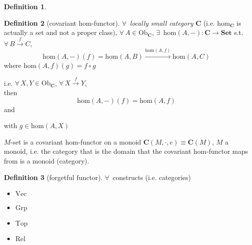 \documentclass[twoside,landscape,10pt]{amsart}
\theoremstyle{plain}
\theoremstyle{definition}
\newtheorem{definition}{Definition}
\theoremstyle{remark}
\begin{document}
\begin{multicols*}{2}
\begin{definition}


\end{definition}


\begin{definition}[covariant hom-functor]
$\forall \, $ \emph{locally small category} $\mathbf{C}$ (i.e. $\text{hom}_{\mathbf{C}}$ is actually a set and not a proper class), $\forall \, A \in \text{Ob}_{\mathbf{C}}$, $\exists \, $  $\text{hom}(A, - ) : \mathbf{C} \to \mathbf{\text{Set}}$ s.t. $\forall \, B \xrightarrow{f} C$, 
\[
\text{hom}(A,-)(f) = \text{hom}(A,B) \xrightarrow{ \text{hom}(A,f)} \text{hom}(A,C)
\]
where $\text{hom}(A,f)(g) = f\circ g$
\end{definition}

i.e. $\forall \, X,Y \in \text{Ob}_{\mathbf{C}}$, $\forall \, X \xrightarrow{f} Y$,  \\

then 
\[
\text{hom}(A,-)(f) = \text{hom}(A,f)
\]
and
with $g\in \text{hom}(A,X)$


$M$-set is a covariant hom-functor on a monoid $\mathbf{C}(M,\cdot,e) \equiv \mathbf{C}(M)$, $M$ a monoid, i.e. the category that is the domain that the covariant hom-functor maps from is a monoid (category).  

\begin{definition}[forgetful functor]
$\forall \, $ constructs (i.e. categories)
\begin{itemize}
  \item $\text{Vec}$
  \item $\text{Grp}$
  \item $\text{Top}$
  \item $\text{Rel}$
\end{itemize}


\end{definition}
\end{multicols*}
\end{document}
